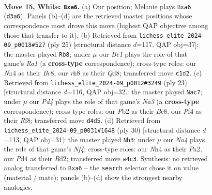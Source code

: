 \documentclass[11pt]{article}
\begin{document}
\begin{figure}[p]
\label{fig:thought-m26}
\end{figure}

\clearpage

\begin{figure}[p]\centering
\begin{subfigure}{0.46\textwidth}\centering
\resizebox{\linewidth}{!}{%
\newchessgame
\chessboard[
  setfen={r6r/p2nkppp/b1pbpn2/q7/Np1P1PPN/3BP3/PP5P/R1BQ1RK1 w - - 1 15},
  showmover=false,
  pgfstyle=straightmove, color=movearrow, markmove={d3-a6}
]}
\caption{}
\end{subfigure}\hfill
\begin{subfigure}{0.46\textwidth}\centering
\resizebox{\linewidth}{!}{%
\newchessgame
\chessboard[
  setfen={r1bq1rk1/p1p2p2/2p2n2/3pB1p1/1b1P3p/2N1P3/PPQ1NPPP/R3K2R b KQ - 1 13},
  showmover=false,
  pgfstyle=straightmove, color=movearrow, markmove={a8-b8}
]}
\caption{}
\end{subfigure}
\\[4pt]
\begin{subfigure}{0.46\textwidth}\centering
\resizebox{\linewidth}{!}{%
\newchessgame
\chessboard[
  setfen={r1bq1rk1/p3ppb1/n1p3pp/1p1nP3/P3N3/1B3N1P/1PP2PP1/R1BQ1RK1 b - - 0 12},
  showmover=false,
  pgfstyle=straightmove, color=movearrow, markmove={a6-c7}
]}
\caption{}
\end{subfigure}\hfill
\begin{subfigure}{0.46\textwidth}\centering
\resizebox{\linewidth}{!}{%
\newchessgame
\chessboard[
  setfen={r1b2rk1/1p3ppp/2pbpn2/6q1/p2P1N2/2PBQ3/PP1B1PPP/R4RK1 w - - 6 16},
  showmover=false,
  pgfstyle=straightmove, color=movearrow, markmove={f4-h3}
]}
\caption{}
\end{subfigure}
\caption{\textbf{Move 15, White: \texttt{Bxa6}.} (a) Our position; Melanie plays \texttt{Bxa6} (\texttt{d3a6}). Panels (b)--(d) are the retrieved master positions whose correspondence most drove this move (highest QAP objective among those that transfer to it). (b) Retrieved from \texttt{lichess\_elite\_2024-09\_p0018\#527} (ply 25) [structural distance $d$=117, QAP obj=37]: the master played \texttt{Rb8}; under $\mu$ our \emph{Bc1} plays the role of that game's \emph{Ra1} (a \textbf{cross-type} correspondence); cross-type roles: our \emph{N}h4 as their \emph{B}c8, our \emph{r}h8 as their \emph{Q}d8; transferred move \texttt{c1d2}. (c) Retrieved from \texttt{lichess\_elite\_2024-09\_p0012\#3249} (ply 23) [structural distance $d$=116, QAP obj=32]: the master played \texttt{Nac7}; under $\mu$ our \emph{Pd4} plays the role of that game's \emph{Na3} (a \textbf{cross-type} correspondence); cross-type roles: our \emph{P}b2 as their \emph{B}c8, our \emph{P}f4 as their \emph{R}f8; transferred move \texttt{d4d5}. (d) Retrieved from \texttt{lichess\_elite\_2024-09\_p0031\#1648} (ply 30) [structural distance $d$=113, QAP obj=31]: the master played \texttt{Nh3}; under $\mu$ our \emph{Na4} plays the role of that game's \emph{Nf4}; cross-type roles: our \emph{N}h4 as their \emph{P}a2, our \emph{P}d4 as their \emph{B}d2; transferred move \texttt{a4c3}. Synthesis: no retrieved analog transferred to \texttt{Bxa6} -- the \texttt{search} selector chose it on value (material / mate); panels (b)--(d) show the strongest nearby analogies.}

\end{figure}
\end{document}
